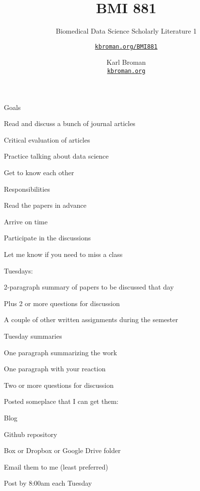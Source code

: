 \documentclass[aspectratio=169,12pt,t]{beamer}
\title{BMI 881}
\subtitle{Biomedical Data Science Scholarly Literature 1}
\author{\href{https://kbroman.org/BMI881}{\tt kbroman.org/BMI881} }
\institute{}
\date{\small \hspace{3in} Karl Broman \\
  \hspace{3in} \href{https://kbroman.org}{\color{foreground}
    \small \tt kbroman.org}}
\begin{document}
{
\frame{
  \titlepage
} }




\begin{frame}{Goals}

  \bbi
\item Read and discuss a bunch of journal articles
\item Critical evaluation of articles
\item Practice talking about data science
\item Get to know each other
  \ei

\end{frame}














\begin{frame}{Responsibilities}

  \bbi
\item Read the papers in advance
\item Arrive on time
\item Participate in the discussions
\item Let me know if you need to miss a class
\item Tuesdays:
  \bi
  \item 2-paragraph summary of papers to be discussed that day
  \item Plus 2 or more questions for discussion
  \ei
\item A couple of other written assignments during the semester
  \ei

\end{frame}



\begin{frame}{Tuesday summaries}

  \bbi
\item One paragraph summarizing the work
\item One paragraph with your reaction
\item Two or more questions for discussion
\item Posted someplace that I can get them:
  \bi
\item Blog
\item Github repository
\item Box or Dropbox or Google Drive folder
\item Email them to me (least preferred)
  \ei
\item Post by 8:00am each Tuesday
\ei

\end{frame}
\end{document}
